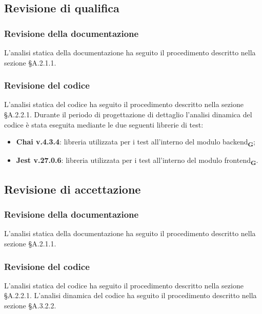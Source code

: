 \subsection{Revisione di qualifica}
\subsubsection{Revisione della documentazione}
L'analisi statica della documentazione ha seguito il procedimento descritto nella sezione §A.2.1.1.
\subsubsection{Revisione del codice}
L'analisi statica del codice ha seguito il procedimento descritto nella sezione §A.2.2.1.
Durante il periodo di progettazione di dettaglio l'analisi dinamica del codice è stata eseguita mediante le due seguenti librerie di test:
\begin{itemize}
    \item \textbf{Chai v.4.3.4}: libreria utilizzata per i test all'interno del modulo backend\textsubscript{\textbf{G}};
    \item \textbf{Jest v.27.0.6}: libreria utilizzata per i test all'interno del modulo frontend\textsubscript{\textbf{G}}.
\end{itemize}
\subsection{Revisione di accettazione}
\subsubsection{Revisione della documentazione}
L'analisi statica della documentazione ha seguito il procedimento descritto nella sezione §A.2.1.1.
\subsubsection{Revisione del codice}
L'analisi statica del codice ha seguito il procedimento descritto nella sezione §A.2.2.1.
L'analisi dinamica del codice ha seguito il procedimento descritto nella sezione §A.3.2.2.
\pagebreak

